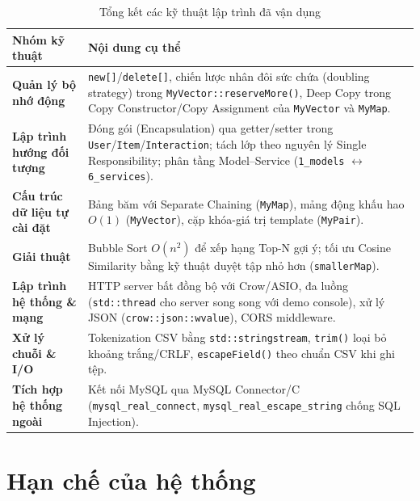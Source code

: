 \documentclass{report}
\begin{document}
\begin{table}[H]
    \centering
    \renewcommand{\arraystretch}{1.5}
    \begin{tabularx}{\textwidth}{|>{\raggedright\arraybackslash}p{4.5cm}|>{\raggedright\arraybackslash}X|}
        \hline
        \textbf{Nhóm kỹ thuật} & \textbf{Nội dung cụ thể} \\ \hline
        \textbf{Quản lý bộ nhớ động} & \texttt{new[]}/\texttt{delete[]}, chiến lược nhân đôi sức chứa (doubling strategy) trong \texttt{MyVector::reserveMore()}, Deep Copy trong Copy Constructor/Copy Assignment của \texttt{MyVector} và \texttt{MyMap}. \\ \hline
        \textbf{Lập trình hướng đối tượng} & Đóng gói (Encapsulation) qua getter/setter trong \texttt{User}/\texttt{Item}/\texttt{Interaction}; tách lớp theo nguyên lý Single Responsibility; phân tầng Model--Service (\texttt{1\_models} $\leftrightarrow$ \texttt{6\_services}). \\ \hline
        \textbf{Cấu trúc dữ liệu tự cài đặt} & Bảng băm với Separate Chaining (\texttt{MyMap}), mảng động khấu hao $O(1)$ (\texttt{MyVector}), cặp khóa-giá trị template (\texttt{MyPair}). \\ \hline
        \textbf{Giải thuật} & Bubble Sort $O(n^2)$ để xếp hạng Top-N gợi ý; tối ưu Cosine Similarity bằng kỹ thuật duyệt tập nhỏ hơn (\texttt{smallerMap}). \\ \hline
        \textbf{Lập trình hệ thống \& mạng} & HTTP server bất đồng bộ với Crow/ASIO, đa luồng (\texttt{std::thread} cho server song song với demo console), xử lý JSON (\texttt{crow::json::wvalue}), CORS middleware. \\ \hline
        \textbf{Xử lý chuỗi \& I/O} & Tokenization CSV bằng \texttt{std::stringstream}, \texttt{trim()} loại bỏ khoảng trắng/CRLF, \texttt{escapeField()} theo chuẩn CSV khi ghi tệp. \\ \hline
        \textbf{Tích hợp hệ thống ngoài} & Kết nối MySQL qua MySQL Connector/C (\texttt{mysql\_real\_connect}, \texttt{mysql\_real\_escape\_string} chống SQL Injection). \\ \hline
    \end{tabularx}
    \caption{Tổng kết các kỹ thuật lập trình đã vận dụng}
    \label{tab:ky_thuat_lap_trinh}
\end{table}

\section{Hạn chế của hệ thống}
\end{document}
